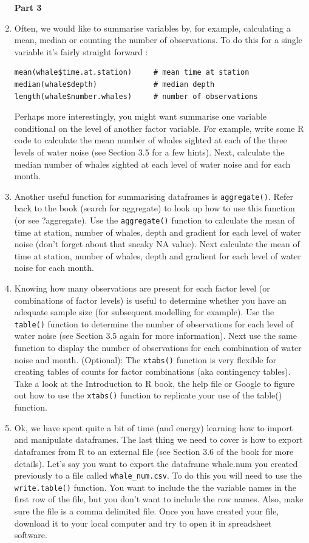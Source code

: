 \documentclass[12pt]{article}
\newcommand{\lst}[1]{\lstinline{#1}}
\begin{document}
\begin{enumerate}
 \centerline{\bf Part 3}

\item Often, we would like to summarise variables by, for example, calculating a mean, median or counting the number of observations. To do this for a single variable it’s fairly straight forward :

 
\begin{lstlisting}
mean(whale$time.at.station)     # mean time at station
median(whale$depth)             # median depth
length(whale$number.whales)     # number of observations
\end{lstlisting}

 Perhaps more interestingly, you might want summarise one variable conditional on the level of another factor variable. For example, write some R code to calculate the mean number of whales sighted at each of the three levels of water noise (see Section 3.5 for a few hints). Next, calculate the median number of whales sighted at each level of water noise and for each month.

 

\item Another useful function for summarising dataframes is \lst{aggregate()}. Refer back to the book (search for aggregate) to look up how to use this function (or see ?aggregate). Use the \lst{aggregate()} function to calculate the mean of time at station, number of whales, depth and gradient for each level of water noise (don’t forget about that sneaky NA value). Next calculate the mean of time at station, number of whales, depth and gradient for each level of water noise for each month.
 

\item Knowing how many observations are present for each factor level (or combinations of factor levels) is useful to determine whether you have an adequate sample size (for subsequent modelling for example). Use the \lst{table()} function to determine the number of observations for each level of water noise (see Section 3.5 again for more information). Next use the same function to display the number of observations for each combination of water noise and month. (Optional): The \lst{xtabs()} function is very flexible for creating tables of counts for factor combinations (aka contingency tables). Take a look at the Introduction to R book, the help file or Google to figure out how to use the \lst{xtabs()} function to replicate your use of the table() function.


\item Ok, we have spent quite a bit of time (and energy) learning how to import and manipulate dataframes. The last thing we need to cover is how to export dataframes from R to an external file (see Section 3.6 of the book for more details). Let’s say you want to export the dataframe whale.num you created previously  to a file called \verb|whale_num.csv|. To do this you will need to use the 
\lst{write.table()} function. You want to include the the variable names in the first row of the file, but you don’t want to include the row names. Also, make sure the file is a comma delimited file. Once you have created your file,
download it to your local computer and try to open it in spreadsheet software.


\end{enumerate}
\end{document}
